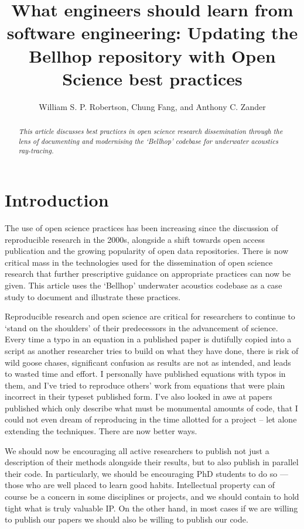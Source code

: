 \documentclass[twocolumn]{willarticle}
\begin{document}
\title{What engineers should learn from software engineering: Updating the Bellhop repository with Open Science best practices}
\author{William S. P. Robertson, Chung Fang, and Anthony C. Zander}

\maketitle

\begin{abstract}\em
This article discusses best practices in open science research dissemination through the lens of documenting and modernising the `Bellhop' codebase for underwater acoustics ray-tracing.
\end{abstract}

\section{Introduction}

The use of open science practices has been increasing since the discussion of reproducible research in the 2000s, alongside a shift towards open access publication and the growing popularity of open data repositories.
There is now critical mass in the technologies used for the dissemination of open science research that further prescriptive guidance on appropriate practices can now be given.
This article uses the `Bellhop' underwater acoustics codebase as a case study to document and illustrate these practices.

Reproducible research and open science are critical for researchers to continue to `stand on the shoulders' of their predecessors in the advancement of science.
Every time a typo in an equation in a published paper is dutifully copied into a script as another researcher tries to build on what they have done, there is risk of wild goose chases, significant confusion as results are not as intended, and leads to wasted time and effort.
I personally have published equations with typos in them, and I've tried to reproduce others' work from equations that were plain incorrect in their typeset published form.
I've also looked in awe at papers published which only describe what must be monumental amounts of code, that I could not even dream of reproducing in the time allotted for a project -- let alone extending the techniques.
There are now better ways.

We should now be encouraging all active researchers to publish not just a description of their methods alongside their results, but to also publish in parallel their code.
In particularly, we should be encouraging PhD students to do so --- those who are well placed to learn good habits.
Intellectual property can of course be a concern in some disciplines or projects, and we should contain to hold tight what is truly valuable IP.
On the other hand, in most cases if we are willing to publish our papers we should also be willing to publish our code.
\end{document}
